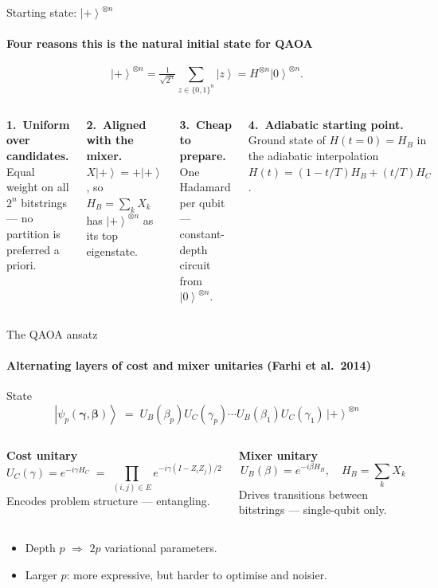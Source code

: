 \documentclass[aspectratio=169,11pt]{beamer}
\newcommand{\ket}[1]{\left|#1\right\rangle}
\newcommand{\HC}{H_{C}}
\newcommand{\HB}{H_{B}}
\newcommand{\UC}{U_{C}}
\newcommand{\UB}{U_{B}}
\begin{document}
\begin{frame}{Starting state: $\ket{+}^{\otimes n}$}
  \framesubtitle{Four reasons this is the natural initial state for QAOA}
  \begin{block}{}
    \[
      \ket{+}^{\otimes n}
      = \tfrac{1}{\sqrt{2^n}}\sum_{z\in\{0,1\}^n}\ket{z}
      = H^{\otimes n}\ket{0}^{\otimes n}.
    \]
  \end{block}
  \begin{columns}[T,onlytextwidth]
      \textbf{1.\ Uniform over candidates.}
      Equal weight on all $2^n$ bitstrings — no partition is preferred a priori.

      \vspace{0.5em}
      \textbf{2.\ Aligned with the mixer.}
      $X\ket{+}=+\ket{+}$, so $\HB = \sum_k X_k$ has $\ket{+}^{\otimes n}$
      as its top eigenstate.

      \textbf{3.\ Cheap to prepare.}
      One Hadamard per qubit --- constant-depth circuit from $\ket{0}^{\otimes n}$.

      \vspace{0.5em}
      \textbf{4.\ Adiabatic starting point.}
      Ground state of $H(t=0)=\HB$ in the adiabatic interpolation
      $H(t)=(1-t/T)\HB + (t/T)\HC$.
  \end{columns}
\end{frame}

\begin{frame}{The QAOA ansatz}
  \framesubtitle{Alternating layers of cost and mixer unitaries (Farhi et al.\ 2014)}
  \begin{block}{State}
    \[
      \ket{\psi_p(\bm\gamma,\bm\beta)} \;=\;
      \UB(\beta_p)\UC(\gamma_p)\cdots \UB(\beta_1)\UC(\gamma_1)\,
      \ket{+}^{\otimes n}
    \]
  \end{block}

  \begin{columns}[T,onlytextwidth]
      \textbf{Cost unitary}
      \[
        \UC(\gamma) = e^{-i\gamma \HC}
        \;=\; \prod_{(i,j)\in E} e^{-i\gamma(I-Z_i Z_j)/2}
      \]
      Encodes problem structure --- entangling.

      \textbf{Mixer unitary}
      \[
        \UB(\beta) = e^{-i\beta \HB},\quad \HB=\sum_k X_k
      \]
      Drives transitions between bitstrings --- single-qubit only.
  \end{columns}

  \vspace{0.4em}
  \begin{itemize}
    \item Depth $p$ \;\(\Rightarrow\)\; $2p$ variational parameters.
    \item Larger $p$: more expressive, but harder to optimise and noisier.
  \end{itemize}
\end{frame}
\end{document}
